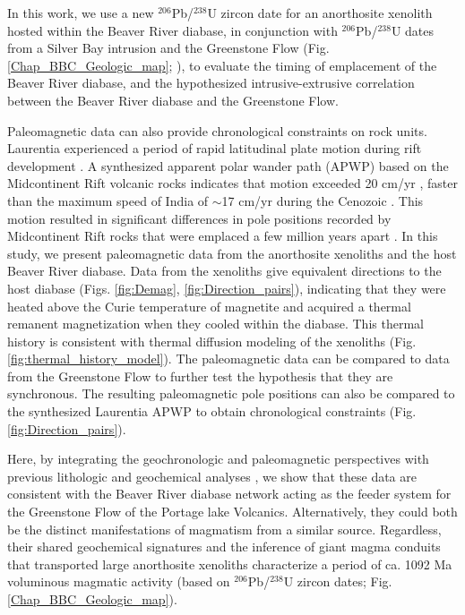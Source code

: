In this work, we use a new $^{206}$Pb/$^{238}$U zircon date for an anorthosite xenolith hosted within the Beaver River diabase, in conjunction with $^{206}$Pb/$^{238}$U dates from a Silver Bay intrusion and the Greenstone Flow (Fig. \ref{Chap_BBC_Geologic_map}; \citealp{Fairchild2017a}), to evaluate the timing of emplacement of the Beaver River diabase, and the hypothesized intrusive-extrusive correlation between the Beaver River diabase and the Greenstone Flow.

Paleomagnetic data can also provide chronological constraints on rock units. Laurentia experienced a period of rapid latitudinal plate motion during rift development \citep{Swanson-Hysell2009a}. A synthesized apparent polar wander path (APWP) based on the Midcontinent Rift volcanic rocks indicates that motion exceeded 20 cm/yr \citep{Swanson-Hysell2019a}, faster than the maximum speed of India of $\sim$17 cm/yr during the Cenozoic \citep{Hinsbergen2011a}. This motion resulted in significant differences in pole positions recorded by Midcontinent Rift rocks that were emplaced a few million years apart \citep{Swanson-Hysell2019a}. In this study, we present paleomagnetic data from the anorthosite xenoliths and the host Beaver River diabase. Data from the xenoliths give equivalent directions to the host diabase (Figs. \ref{fig:Demag}, \ref{fig:Direction_pairs}), indicating that they were heated above the Curie temperature of magnetite and acquired a thermal remanent magnetization when they cooled within the diabase. This thermal history is consistent with thermal diffusion modeling of the xenoliths (Fig. \ref{fig:thermal_history_model}). The paleomagnetic data can be compared to data from the Greenstone Flow to further test the hypothesis that they are synchronous. The resulting paleomagnetic pole positions can also be compared to the synthesized Laurentia APWP to obtain chronological constraints (Fig. \ref{fig:Direction_pairs}).

Here, by integrating the geochronologic and paleomagnetic perspectives with previous lithologic and geochemical analyses \citep{Miller1997a, Doyle2016a}, we show that these data are consistent with the Beaver River diabase network acting as the feeder system for the Greenstone Flow of the Portage lake Volcanics. Alternatively, they could both be the distinct manifestations of magmatism from a similar source. Regardless, their shared geochemical signatures and the inference of giant magma conduits that transported large anorthosite xenoliths characterize a period of ca. 1092 Ma voluminous magmatic activity (based on $^{206}$Pb/$^{238}$U zircon dates; Fig. \ref{Chap_BBC_Geologic_map}).

